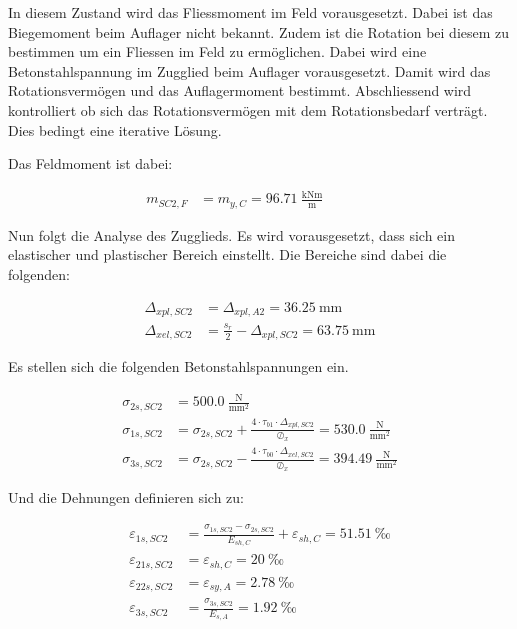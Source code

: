 \documentclass[
  11pt,
  letterpaper,
]{scrreprt}
\begin{document}
In diesem Zustand wird das Fliessmoment im Feld vorausgesetzt. Dabei ist
das Biegemoment beim Auflager nicht bekannt. Zudem ist die Rotation bei
diesem zu bestimmen um ein Fliessen im Feld zu ermöglichen. Dabei wird
eine Betonstahlspannung im Zugglied beim Auflager vorausgesetzt. Damit
wird das Rotationsvermögen und das Auflagermoment bestimmt.
Abschliessend wird kontrolliert ob sich das Rotationsvermögen mit dem
Rotationsbedarf verträgt. Dies bedingt eine iterative Lösung.

Das Feldmoment ist dabei:

\[
\begin{aligned}
m_{SC2 , F}& = m_{y , C} = 96.71 \ \frac{\mathrm{kNm}}{\mathrm{m}} \quad &  \quad &  
 \end{aligned}
\]

Nun folgt die Analyse des Zugglieds. Es wird vorausgesetzt, dass sich
ein elastischer und plastischer Bereich einstellt. Die Bereiche sind
dabei die folgenden:

\[
\begin{aligned}
\Delta_{x pl , SC2}& = \Delta_{x pl , A2} = 36.25 \ \mathrm{mm} \\ 
\Delta_{x el , SC2}& = \frac{s_{r}}{2} - \Delta_{x pl , SC2} = 63.75 \ \mathrm{mm} \end{aligned}
\]

Es stellen sich die folgenden Betonstahlspannungen ein.

\[
\begin{aligned}
\sigma_{2 s , SC2}& = 500.0 \ \frac{\mathrm{N}}{\mathrm{mm}^{2}} \\ 
\sigma_{1 s , SC2}& = \sigma_{2 s , SC2} + \frac{4 \cdot \tau_{b1} \cdot \Delta_{x pl , SC2}}{\oslash_{x}} = 530.0 \ \frac{\mathrm{N}}{\mathrm{mm}^{2}} \\ 
\sigma_{3 s , SC2}& = \sigma_{2 s , SC2} - \frac{4 \cdot \tau_{b0} \cdot \Delta_{x el , SC2}}{\oslash_{x}} = 394.49 \ \frac{\mathrm{N}}{\mathrm{mm}^{2}} \end{aligned}
\]

Und die Dehnungen definieren sich zu:

\[
\begin{aligned}
\varepsilon_{1 s , SC2}& = \frac{\sigma_{1 s , SC2} - \sigma_{2 s , SC2}}{E_{sh , C}} + \varepsilon_{sh , C} = 51.51 \ \mathrm{‰} \\ 
\varepsilon_{21 s , SC2}& = \varepsilon_{sh , C} = 20 \ \mathrm{‰} \\ 
\varepsilon_{22 s , SC2}& = \varepsilon_{sy , A} = 2.78 \ \mathrm{‰} \\ 
\varepsilon_{3 s , SC2}& = \frac{\sigma_{3 s , SC2}}{E_{s , A}} = 1.92 \ \mathrm{‰} \end{aligned}
\]
\end{document}
